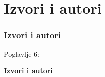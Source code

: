 %

\section{Izvori i autori}
\begin{frame}[fragile]
	\frametitle{Izvori i autori}

	\begin{center}\huge{Poglavlje 6:}\end{center}
	\begin{center}\huge{\color{typo3darkgrey}\textbf{Izvori i autori}}\end{center}

\end{frame}


